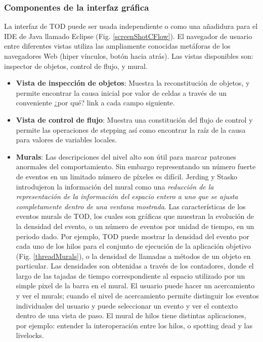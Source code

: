 \documentclass[12pt,legalpaper]{report}
\begin{document}
			\subsubsection{Componentes de la interfaz gráfica}

La interfaz de TOD puede ser usada independiente o como una añadidura para el IDE de Java llamado Eclipse (Fig. \ref{screenShotCFlow}).  El navegador de usuario entre diferentes vistas utiliza las ampliamente conocidas metáforas de los navegadores Web (hiper vínculos, botón hacia atrás).  Las vistas disponibles son:  inspector de objetos, control de flujo, y mural.  

\begin{itemize}	
	
	\item \textbf{Vista de inspección de objetos}: Muestra la reconstitución de objetos, y permite encontrar la causa inicial por valor de celdas a través de un conveniente ¿por qué? link a cada campo siguiente. 
	
	\item \textbf{Vista de control de flujo}: Muestra una constitución del flujo de control y permite las operaciones de stepping así como encontrar la raíz de la causa para valores de variables locales.

	\item \textbf{Murals}: Las descripciones del nivel alto son útil para marcar patrones anormales del comportamiento.  Sin embargo representando un número fuerte de eventos en un limitado número de píxeles es difícil.  Jerding y Stasko introdujeron la información del mural \cite{mural} como una \textit{reducción de la representación de la información del espacio entero a uno que se ajusta completamente dentro de una ventana mostrada}.  Las características de los eventos murals de TOD, los cuales son gráficas que muestran la evolución de la densidad del evento, o un número de eventos por unidad de tiempo, en un periodo dado.  Por ejemplo, TOD puede mostrar la densidad del evento por cada uno de los hilos para el conjunto de ejecución de la aplicación objetivo (Fig. \ref{threadMurals}), o la densidad de llamadas a métodos de un objeto en particular.  Las densidades son obtenidas a través  de los contadores, donde el largo de las tajadas de tiempo correspondiente al espacio utilizado por un simple pixel de la barra en el mural.  El usuario puede hacer un acercamiento y ver el murals;  cuando el nivel de acercamiento permite distinguir los eventos individuales del usuario y puede seleccionar un evento y ver el contexto dentro de una vista de paso.  El mural de hilos tiene distintas aplicaciones, por ejemplo: entender la interoperación entre los hilos, o spotting dead y las livelocks.
	
\end{itemize}
\end{document}

